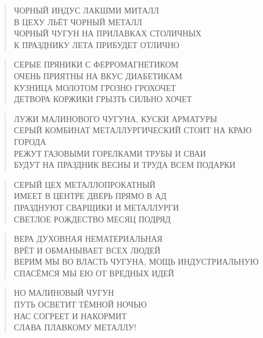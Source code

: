 \poemtitle{***}
\begin{verse}
ЧОРНЫЙ ИНДУС ЛАКШМИ МИТАЛЛ\\
В ЦЕХУ ЛЬЁТ ЧОРНЫЙ МЕТАЛЛ\\
ЧОРНЫЙ ЧУГУН НА ПРИЛАВКАХ СТОЛИЧНЫХ\\
К ПРАЗДНИКУ ЛЕТА ПРИБУДЕТ ОТЛИЧНО
\end{verse}

\poemtitle{***}
\begin{verse}
СЕРЫЕ ПРЯНИКИ С ФЕРРОМАГНЕТИКОМ\\
ОЧЕНЬ ПРИЯТНЫ НА ВКУС ДИАБЕТИКАМ\\
КУЗНИЦА МОЛОТОМ ГРОЗНО ГРОХОЧЕТ\\
ДЕТВОРА КОРЖИКИ ГРЫЗТЬ СИЛЬНО ХОЧЕТ
\end{verse}

\poemtitle{***}
\begin{verse}
ЛУЖИ МАЛИНОВОГО ЧУГУНА, КУСКИ АРМАТУРЫ\\
СЕРЫЙ КОМБИНАТ МЕТАЛЛУРГИЧЕСКИЙ СТОИТ НА КРАЮ ГОРОДА\\
РЕЖУТ ГАЗОВЫМИ ГОРЕЛКАМИ ТРУБЫ И СВАИ\\
БУДУТ НА ПРАЗДНИК ВЕСНЫ И ТРУДА ВСЕМ ПОДАРКИ
\end{verse}

\poemtitle{***}
\begin{verse}
СЕРЫЙ ЦЕХ МЕТАЛЛОПРОКАТНЫЙ\\
ИМЕЕТ В ЦЕНТРЕ ДВЕРЬ ПРЯМО В АД\\
ПРАЗДНУЮТ СВАРЩИКИ И МЕТАЛЛУРГИ\\
СВЕТЛОЕ РОЖДЕСТВО МЕСЯЦ ПОДРЯД
\end{verse}

\poemtitle{***}
\begin{verse}
ВЕРА ДУХОВНАЯ НЕМАТЕРИАЛЬНАЯ\\
ВРЁТ И ОБМАНЫВАЕТ ВСЕХ ЛЮДЕЙ\\
ВЕРИМ МЫ ВО ВЛАСТЬ ЧУГУНА, МОЩЬ ИНДУСТРИАЛЬНУЮ\\
СПАСЁМСЯ МЫ ЕЮ ОТ ВРЕДНЫХ ИДЕЙ
\end{verse}

\poemtitle{***}
\begin{verse}
НО МАЛИНОВЫЙ ЧУГУН\\
ПУТЬ ОСВЕТИТ ТЁМНОЙ НОЧЬЮ\\
НАС СОГРЕЕТ И НАКОРМИТ\\
СЛАВА ПЛАВКОМУ МЕТАЛЛУ!
\end{verse}

